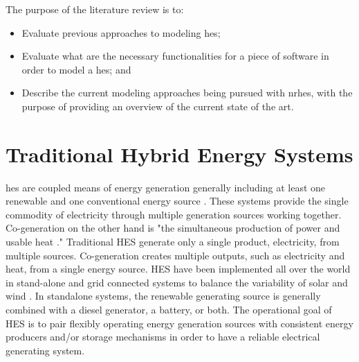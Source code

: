 The purpose of the literature review is to:
\begin{itemize}
\item Evaluate previous approaches to modeling \ac{hes};
\item Evaluate what are the necessary functionalities for a piece of software in order to model a \ac{hes}; and
\item Describe the current modeling approaches being pursued with \ac{nrhes}, with the purpose of providing an overview of the current state of the art.
\end{itemize}



\section{Traditional Hybrid Energy Systems}
\ac{hes} are coupled means of energy generation generally including at least one renewable and one conventional energy source \cite {Ibrahim2011}. These systems provide the single commodity of electricity through multiple generation sources working together. Co-generation on the other hand is "the simultaneous production of power and usable heat \cite{Rosen2005}." Traditional HES generate only a single product, electricity, from multiple sources. Co-generation creates multiple outputs, such as electricity and heat, from a single energy source. HES have been implemented all over the world in stand-alone and grid connected systems to balance the variability of solar and wind \cite {Garcia2015, Qi2014, Shin2015, Nixon2012, Adaramola2014, Goodbody2013, BorgesNeto2010, McGowan1996}. In standalone systems, the renewable generating source is generally combined with a diesel generator, a battery, or both. The operational goal of HES is to pair flexibly operating energy generation sources with consistent energy producers and/or storage mechanisms in order to have a reliable electrical generating system.

